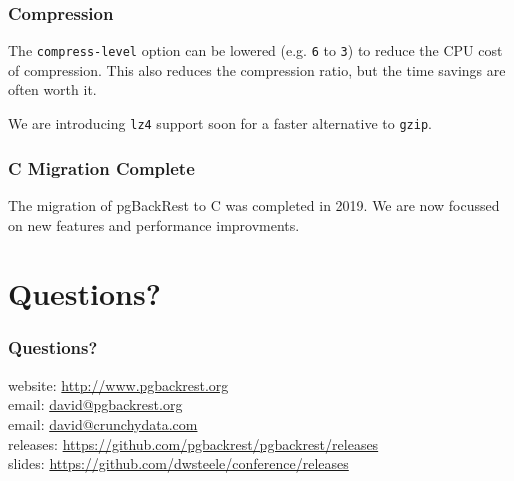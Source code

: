\begin{frame}
    \frametitle{Compression}

    The \texttt{compress-level} option can be lowered (e.g. \texttt{6} to \texttt{3}) to reduce the CPU cost of compression. This also reduces the compression ratio, but the time savings are often worth it.\pause

    \vspace{1em}We are introducing \texttt{lz4} support soon for a faster alternative to \texttt{gzip}.
\end{frame}

\begin{frame}
    \frametitle{C Migration Complete}

    The migration of pgBackRest to C was completed in 2019.  We are now focussed on new features and performance improvments.
\end{frame}

\section{Questions?}

\begin{frame}
    \frametitle{Questions?}

    website: \url{http://www.pgbackrest.org}\\
    \vspace{1em}
    email: \href{mailto:david@pgbackrest.org}{david@pgbackrest.org} \\
    email: \href{mailto:david@crunchydata.com}{david@crunchydata.com}\\
    \vspace{1em}
    releases: \url{https://github.com/pgbackrest/pgbackrest/releases}\\
    \vspace{1em}
    slides: \url{https://github.com/dwsteele/conference/releases}\\
\end{frame}


